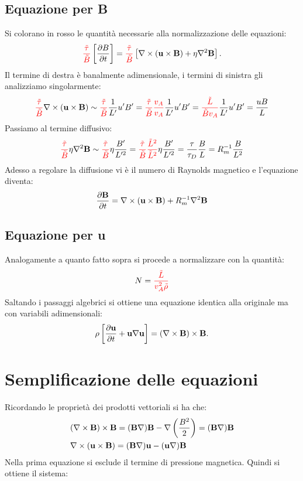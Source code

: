 \subsection{Equazione per B}
Si colorano in rosso le quantità necessarie alla normalizzazione delle equazioni:
\begin{equation}
    \textcolor{red}{\frac{\tilde{\tau}}{\tilde{B}}}
    \left[\pd{B}\right]
    =
    \textcolor{red}{\frac{\tilde{\tau }}{\tilde{B }}}
    \left[ \nabla \times (\vv{u} \times \vv{B}) + \eta \nabla^2 \vv{B} \right].
\end{equation}
Il termine di destra è banalmente adimensionale, i termini di sinistra gli analizziamo singolarmente:
\[
    \textcolor{red}{\frac{\tilde{\tau }}{\tilde{B }}}
    \nabla \times (\vv{u} \times \vv{B})
    \sim
    \textcolor{red}{\frac{\tilde{\tau }}{\tilde{B }}}
    \frac{1}{L'} u' B'
    =
    \textcolor{red}{\frac{\tilde{\tau }}{\tilde{B }}
        \frac{v_A}{v_A}} \frac{1}{L'} u' B'
    =
    \textcolor{red}{\frac{\tilde{L}}{\tilde{B}v_A}}\frac{1}{L'} u' B'
    =
    \frac{uB}{L}
\]
Passiamo al termine diffusivo:
\[
    \textcolor{red}{\frac{\tilde{\tau }}{\tilde{B }}}
    \eta \nabla^2 \vv{B}
    \sim
    \textcolor{red}{\frac{\tilde{\tau }}{\tilde{B }}} \eta \frac{B'}{L'^2}
    =
    \textcolor{red}{\frac{\tilde{\tau }}{\tilde{B }} \frac{\tilde{L}^2}{\tilde{L}^2}} \eta \frac{B'}{L'^2}
    = \frac{\tau }{\tau_D } \frac{B}{L} = R_m^{-1} \frac{B}{L^2}
\]
Adesso a regolare la diffusione vi è il numero di Raynolds magnetico e l'equazione diventa:
\[
    \pd{\vv{B}} = \nabla \times (\vv{u} \times \vv{B}) + R_m^{-1} \nabla^2 \vv{B}
\]
\subsection{Equazione per u}
Analogamente a quanto fatto sopra si procede a normalizzare con la quantità:
\[
    N =  \textcolor{red}{\frac{\tilde{L}}{v_A^2 \tilde{\rho}}}
\]
Saltando i passaggi algebrici si ottiene una equazione identica alla originale ma con variabili adimensionali:
\[
    \rho \left[\pd{\vv{u}} + \vv{u} \nabla \vv{u}\right] = (\nabla \times \vv{B} ) \times \vv{B}.
\]

\section{Semplificazione delle equazioni}
Ricordando le proprietà dei prodotti vettoriali si ha che:
\begin{align}
     & (\nabla \times \vv{B}) \times \vv{B
    } = (\vv{B}\nabla)\vv{B} - \nabla\left(\frac{B^2 }{2}\right) = (\vv{B}\nabla)\vv{B}      \\
     & \nabla \times (\vv{u} \times \vv{B}) = (\vv{B} \nabla) \vv{u} - (\vv{u}\nabla) \vv{B}
\end{align}
Nella prima equazione si esclude il termine di pressione magnetica.
Quindi si ottiene il sistema:

